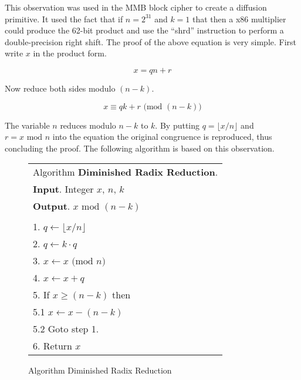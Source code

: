 \documentclass[b5paper]{book}
\begin{document}
This observation was used in the MMB \cite{MMB} block cipher to create a diffusion primitive.  It used the fact that if $n = 2^{31}$ and $k=1$ that 
then a x86 multiplier could produce the 62-bit product and use  the ``shrd'' instruction to perform a double-precision right shift.  The proof
of the above equation is very simple.  First write $x$ in the product form.

\begin{equation}
x = qn + r
\end{equation}

Now reduce both sides modulo $(n - k)$.

\begin{equation}
x \equiv qk + r  \mbox{ (mod }(n-k)\mbox{)}
\end{equation}

The variable $n$ reduces modulo $n - k$ to $k$.  By putting $q = \lfloor x/n \rfloor$ and $r = x \mbox{ mod } n$ 
into the equation the original congruence is reproduced, thus concluding the proof.  The following algorithm is based on this observation.

\begin{figure}[!here]
\begin{small}
\begin{center}
\begin{tabular}{l}
\hline Algorithm \textbf{Diminished Radix Reduction}. \\
\textbf{Input}.   Integer $x$, $n$, $k$ \\
\textbf{Output}.  $x \mbox{ mod } (n - k)$ \\
\hline \\
1.  $q \leftarrow \lfloor x / n \rfloor$ \\
2.  $q \leftarrow k \cdot q$ \\
3.  $x \leftarrow x \mbox{ (mod }n\mbox{)}$ \\
4.  $x \leftarrow x + q$ \\
5.  If $x \ge (n - k)$ then \\
\hspace{3mm}5.1  $x \leftarrow x - (n - k)$ \\
\hspace{3mm}5.2  Goto step 1. \\
6.  Return $x$ \\
\hline
\end{tabular}
\end{center}
\end{small}
\caption{Algorithm Diminished Radix Reduction}
\label{fig:DR}
\end{figure}
\end{document}
